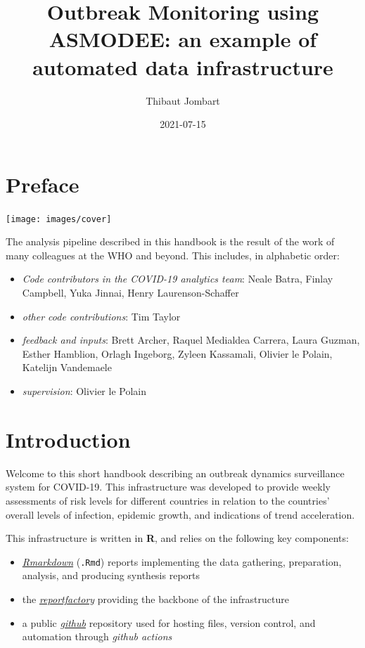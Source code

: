 \documentclass[]{book}
\title{Outbreak Monitoring using ASMODEE: an example of automated data infrastructure}
\author{Thibaut Jombart}
\date{2021-07-15}
\begin{document}
\maketitle

{
\setcounter{tocdepth}{1}
\tableofcontents
}
\hypertarget{preface}{%
\chapter*{Preface}\label{preface}}

\begin{center}\texttt{[image: images/cover]} \end{center}

The analysis pipeline described in this handbook is the result of the work of
many colleagues at the WHO and beyond. This includes, in alphabetic order:

\begin{itemize}
\item
  \emph{Code contributors in the COVID-19 analytics team}: Neale Batra, Finlay
  Campbell, Yuka Jinnai, Henry Laurenson-Schaffer
\item
  \emph{other code contributions}: Tim Taylor
\item
  \emph{feedback and inputs}: Brett Archer, Raquel Medialdea Carrera, Laura Guzman,
  Esther Hamblion, Orlagh Ingeborg, Zyleen Kassamali, Olivier le Polain,
  Katelijn Vandemaele
\item
  \emph{supervision}: Olivier le Polain
\end{itemize}

\hypertarget{intro}{%
\chapter{Introduction}\label{intro}}

Welcome to this short handbook describing an outbreak dynamics surveillance
system for COVID-19. This infrastructure was developed to provide weekly
assessments of risk levels for different countries in relation to the countries'
overall levels of infection, epidemic growth, and indications of trend
acceleration.

This infrastructure is written in \textbf{R}, and relies on the following key
components:

\begin{itemize}
\item
  \href{https://rmarkdown.rstudio.com/}{\emph{Rmarkdown}} (\texttt{.Rmd}) reports implementing
  the data gathering, preparation, analysis, and producing synthesis reports
\item
  the \href{https://www.reconverse.org/reportfactory/}{\emph{reportfactory}} providing the
  backbone of the infrastructure
\item
  a public \href{https://github.com/whocov/trend_analysis_public}{\emph{github}}
  repository used for hosting files, version control, and automation through
  \emph{github actions}
\end{itemize}
\end{document}
